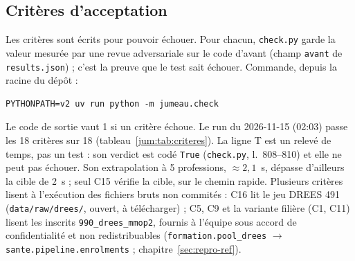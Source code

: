 \subsection{Critères d'acceptation}\label{jum:criteres}

Les critères sont écrits pour pouvoir échouer. Pour chacun, \texttt{check.py} garde la valeur mesurée par une
revue adversariale sur le code d'avant (champ \texttt{avant} de \texttt{results.json}) ; c'est la preuve que le
test sait échouer. Commande, depuis la racine du dépôt :
\begin{verbatim}
PYTHONPATH=v2 uv run python -m jumeau.check
\end{verbatim}
Le code de sortie vaut 1 si un critère échoue. Le run du 2026-11-15 (02:03) passe les 18\mesure{} critères sur
18 (tableau~\ref{jum:tab:criteres}). La ligne T est un relevé de temps, pas un test : son verdict est codé
\texttt{True} (\texttt{check.py}, l.~808--810) et elle ne peut pas échouer. Son extrapolation à 5 professions,
$\approx 2{,}1$~s\derive, dépasse d'ailleurs la cible de 2~s ; seul C15 vérifie la cible, sur le chemin rapide.
Plusieurs critères lisent à l'exécution des fichiers bruts non commités : C16 lit le jeu DREES 491
(\texttt{data/raw/drees/}, ouvert, à télécharger) ; C5, C9 et la variante filière (C1, C11) lisent les inscrits
\texttt{990\_drees\_mmop2}, fournis à l'équipe sous accord de confidentialité et non redistribuables
(\texttt{formation.pool\_drees} $\to$ \texttt{sante.pipeline.enrolments} ; chapitre~\ref{sec:repro-ref}).

